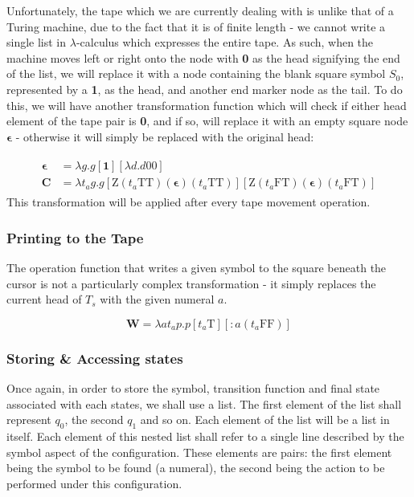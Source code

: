 \documentclass[Master.tex]{subfiles}
\begin{document}
Unfortunately, the tape which we are currently dealing with is unlike that of a Turing machine, due to the fact that it is of finite length - we cannot write a single list in $\lambda$-calculus which expresses the entire tape. As such, when the machine moves left or right onto the node with \textbf{0} as the head signifying the end of the list, we will replace it with a node containing the blank square symbol $S_0$, represented by a \textbf{1}, as the head, and another end marker node as the tail. To do this, we will have another transformation function which will check if either head element of the tape pair is \textbf{0}, and if so, will replace it with an empty square node $\bm{\epsilon}$ - otherwise it will simply be replaced with the original head:

\begin{gather*}
\begin{aligned}
\bm{\epsilon} &= \lambda g.g[\bm{\textbf{1}}][\lambda d.d\bm{\mathrm{0}}\bm{\mathrm{0}}] \\
\bm{C} &= \lambda t_a g.g[\bm{\mathrm{Z}}(t_a\bm{\mathrm{T}}\bm{\mathrm{T}})(\bm{\epsilon})(t_a\bm{\mathrm{T}}\bm{\mathrm{T}})][\bm{\mathrm{Z}}(t_a\bm{\mathrm{F}}\bm{\mathrm{T}})(\bm{\epsilon})(t_a\bm {\mathrm{F}}\bm{\mathrm{T}})]
\end{aligned}
\end{gather*}
This transformation will be applied after every tape movement operation.

\subsubsection{Printing to the Tape}

The operation function that writes a given symbol to the square beneath the cursor is not a particularly complex transformation - it simply replaces the current head of $T_s$ with the given numeral $a$.

\begin{equation*}
\bm{W} = \lambda a t_a p.p[t_a\bm{\mathrm{T}}][\mathrm{\bm{:}} a (t_a \bm{\mathrm{FF}})]
\end{equation*}

\subsubsection{Storing \& Accessing states}
Once again, in order to store the symbol, transition function and final state associated with each states, we shall use a list. The first element of the list shall represent $q_0$, the second $q_1$ and so on.
Each element of the list will be a list in itself. Each element of this nested list shall refer to a single line described by the symbol aspect of the configuration. These elements are pairs: the first element being the symbol to be found (a numeral), the second being the action to be performed under this configuration.
\end{document}
